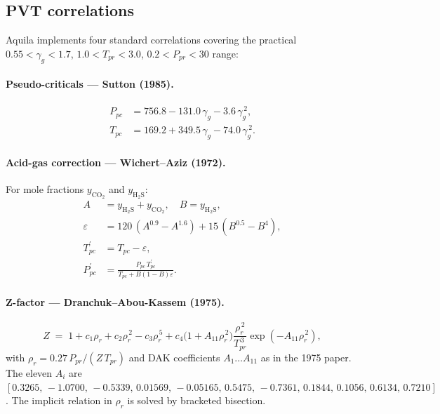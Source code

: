 \documentclass[11pt,a4paper]{article}
\begin{document}
\subsection{PVT correlations}

Aquila implements four standard correlations covering the practical
$0.55 < \gamma_g < 1.7$, $1.0 < T_{pr} < 3.0$, $0.2 < P_{pr} < 30$ range:

\paragraph{Pseudo-criticals — Sutton (1985).}
\begin{align}
    P_{pc} &= 756.8 - 131.0\,\gamma_g - 3.6\,\gamma_g^{\,2}, \\
    T_{pc} &= 169.2 + 349.5\,\gamma_g - 74.0\,\gamma_g^{\,2}.
\end{align}

\paragraph{Acid-gas correction — Wichert--Aziz (1972).}
For mole fractions $y_{\mathrm{CO}_2}$ and $y_{\mathrm{H}_2\mathrm{S}}$:
\begin{align}
    A &= y_{\mathrm{H}_2\mathrm{S}} + y_{\mathrm{CO}_2},\quad
    B  = y_{\mathrm{H}_2\mathrm{S}}, \\
    \varepsilon &= 120\,(A^{0.9}-A^{1.6}) + 15\,(B^{0.5}-B^4), \\
    T_{pc}^\prime &= T_{pc} - \varepsilon, \\
    P_{pc}^\prime &= \frac{P_{pc}\,T_{pc}^\prime}{T_{pc} + B(1-B)\varepsilon}.
\end{align}

\paragraph{Z-factor — Dranchuk--Abou-Kassem (1975).}
\begin{equation}
    Z \;=\; 1 + c_1\rho_r + c_2\rho_r^{\,2} - c_3\rho_r^{\,5}
            + c_4\bigl(1+A_{11}\rho_r^{\,2}\bigr)\frac{\rho_r^{\,2}}{T_{pr}^{\,3}}\exp(-A_{11}\rho_r^{\,2}),
\end{equation}
with $\rho_r = 0.27\,P_{pr}/(Z\,T_{pr})$ and DAK coefficients
$A_1\ldots A_{11}$ as in the 1975 paper. The eleven $A_i$ are
$[0.3265,\, -1.0700,\, -0.5339,\, 0.01569,\, -0.05165,\, 0.5475,\,
-0.7361,\, 0.1844,\, 0.1056,\, 0.6134,\, 0.7210]$. The implicit
relation in $\rho_r$ is solved by bracketed bisection.
\end{document}
